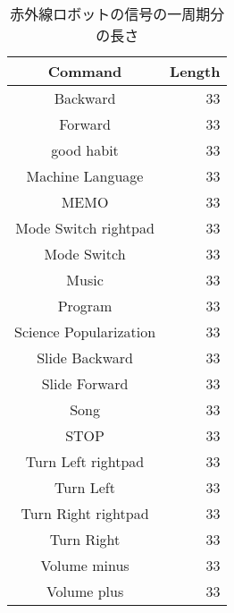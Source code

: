 \begin{table}[htbp]
    \caption{赤外線ロボットの信号の一周期分の長さ}
    \label{ir_robot_signal_ideal}
    \begin{tabular}{c|r}
Command & Length \\
\hline
Backward & 33 \\
Forward & 33 \\
good habit & 33 \\
Machine Language & 33 \\
MEMO & 33 \\
Mode Switch rightpad & 33 \\
Mode Switch & 33 \\
Music & 33 \\
Program & 33 \\
Science Popularization & 33 \\
Slide Backward & 33 \\
Slide Forward & 33 \\
Song & 33 \\
STOP & 33 \\
Turn Left rightpad & 33 \\
Turn Left & 33 \\
Turn Right rightpad & 33 \\
Turn Right & 33 \\
Volume minus & 33 \\
Volume plus & 33
    \end{tabular}
\end{table}
